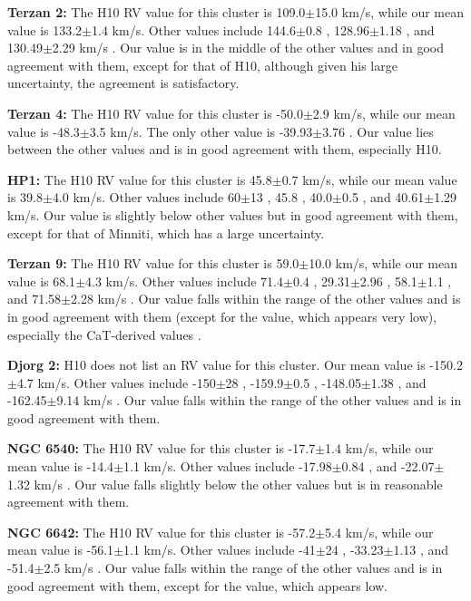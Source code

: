 \documentclass[onecolumn]{aa}
\begin{document}
{\bf Terzan 2:} 
The H10 RV value for this cluster is 109.0$\pm$15.0 km/s, while our mean value is 133.2$\pm$1.4 km/s. Other values include 144.6$\pm$0.8 \citep{Vasquez2018}, 128.96$\pm$1.18 \citep{Baumgardt2019}, and 130.49$\pm$2.29 km/s \citep{Geisler2021}.
Our value is in the middle of the other values and in good  agreement with them, except for that of H10, although given his large uncertainty, the agreement is satisfactory. 

{\bf Terzan 4:}
The H10 RV value for this cluster is -50.0$\pm$2.9 km/s, while our mean value is -48.3$\pm$3.5 km/s. The only other value is -39.93$\pm$3.76 \citep{Baumgardt2019}.
Our value lies between the other values and is in good  agreement with them, especially H10.

{\bf HP1:}
The H10 RV value for this cluster is 45.8$\pm$0.7 km/s, while our mean value is 39.8$\pm$4.0 km/s. Other values include 60$\pm$13 \citep{Minniti1995b}, 45.8 \citep{Barbuy2006}, 40.0$\pm$0.5 \citep{Barbuy2016}, and 40.61$\pm$1.29 \citep{Baumgardt2019} km/s.
Our value is slightly below other values but in good  agreement with them, except for that of Minniti, which has a large uncertainty.

{\bf Terzan 9:}
The H10 RV value for this cluster is 59.0$\pm$10.0 km/s, while our mean value is 68.1$\pm$4.3 km/s. Other values include 71.4$\pm$0.4 \citep{Vasquez2018}, 29.31$\pm$2.96 \citep{Baumgardt2019}, 58.1$\pm$1.1 \citep{Ernandes2019}, and 71.58$\pm$2.28 km/s \citep{Geisler2021}.
Our value falls within the range of the other values and is in good  agreement with them (except for the \cite{Baumgardt2019} value, which appears very low),  especially the CaT-derived values \citep{Vasquez2018,Geisler2021}.  

{\bf Djorg 2:}
H10 does not list an RV value for this cluster. Our mean value is -150.2$\pm$4.7 km/s. Other values include -150$\pm$28 \citep{Dias2016}, -159.9$\pm$0.5 \citep{Vasquez2018}, -148.05$\pm$1.38 \citep{Baumgardt2019}, and -162.45$\pm$9.14 km/s \citep{Geisler2021}.
Our value falls within the range of the other values and is in good  agreement with them. 

{\bf NGC 6540:}
The H10 RV value for this cluster is -17.7$\pm$1.4 km/s, while our mean value is -14.4$\pm$1.1 km/s. Other values include -17.98$\pm$0.84 \citep{Baumgardt2019}, and -22.07$\pm$1.32 km/s \citep{Geisler2021}.
Our value falls slightly below the other values but is in reasonable  agreement with them. 

{\bf NGC 6642:}
The H10 RV value for this cluster is -57.2$\pm$5.4 km/s, while our mean value is -56.1$\pm$1.1 km/s. Other values include -41$\pm$24 \citep{Minniti1995b},  -33.23$\pm$1.13 \citep{Baumgardt2019}, and -51.4$\pm$2.5 km/s \citep{Geisler2021}.
Our value falls within the range of the other values and is in good  agreement with them, except for the \cite{Baumgardt2019} value, which appears low.
\end{document}
